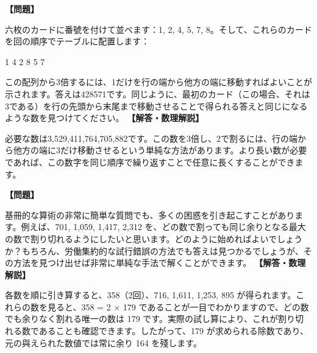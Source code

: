 \documentclass[10pt,a4paper,oneside,openany]{ltjsbook}
\begin{document}
\begin{tcolorbox}[colback=softblue,colframe=primaryblue,title=\textbf{第 126 問：単純な乗算 （原題: SIMPLE MULTIPLICATION.）},arc=2mm,boxrule=1pt,breakable]
\textbf{【問題】}\par\vspace{0.3em}
六枚のカードに番號を付けて並べます：1, 2, 4, 5, 7, 8。そして、これらのカードを回の順序でテーブルに配置します：

    1     4     2     8     5     7

この配列から3倍するには、1だけを行の端から他方の端に移動すればよいことが示されます。答えは428571です。同じように、最初のカード（この場合、それは3である）を行の先頭から末尾まで移動させることで得られる答えと同じになるような数を見つけてください。
\tcblower
\textbf{【解答・数理解説】}\par\vspace{0.3em}
必要な数は3,529,411,764,705,882です。この数を3倍し、2で割るには、行の端から他方の端に3だけ移動させるという単純な方法があります。より長い数が必要であれば、この数字を同じ順序で繰り返すことで任意に長くすることができます。
\end{tcolorbox}

\begin{tcolorbox}[colback=softblue,colframe=primaryblue,title=\textbf{第 127 問：単純な除法 （原題: SIMPLE DIVISION.）},arc=2mm,boxrule=1pt,breakable]
\textbf{【問題】}\par\vspace{0.3em}
基冊的な算術の非常に簡単な質問でも、多くの困惑を引き起こすことがあります。例えば、701, 1,059, 1,417, 2,312 を、どの数で割っても同じ余りとなる最大の数で割り切れるようにしたいと思います。どのように始めればよいでしょうか？もちろん、労働集約的な試行錯誤の方法でも答えは見つかるでしょうが、その方法を見つけ出せば非常に単純な手法で解くことができます。
\tcblower
\textbf{【解答・数理解説】}\par\vspace{0.3em}
各数を順に引き算すると、358（2回）、716, 1,611, 1,253, 895 が得られます。これらの数を見ると、358 = 2 × 179 であることが一目でわかりますので、どの数でも余りなく割れる唯一の数は 179 です。実際の試し算により、これが割り切れる数であることも確認できます。したがって、179 が求められる除数であり、元の與えられた数値では常に余り 164 を殘します。
\end{tcolorbox}
\end{document}
